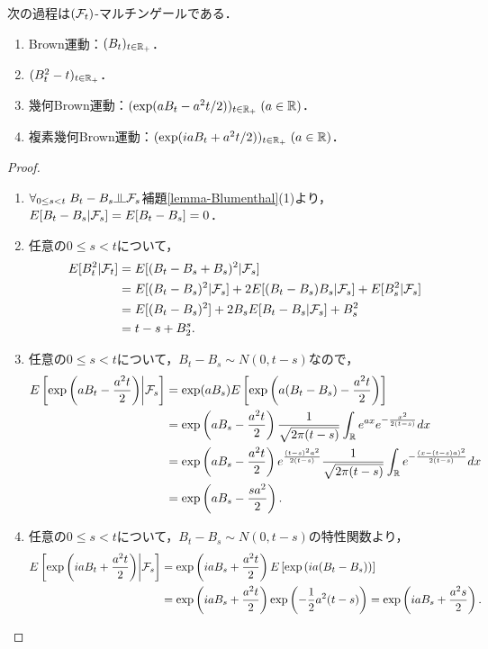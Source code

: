\documentclass[uplatex,dvipdfmx]{jsreport}
\begin{document}
\begin{theorem}
    次の過程は$(\mathcal{F}_t)$-マルチンゲールである．
    \begin{enumerate}
        \item Brown運動：$(B_t)_{t\in\mathbb{R}_+}$．
        \item $(B^2_t-t)_{t\in\mathbb{R}_+}$．
        \item 幾何Brown運動：$(\exp(aB_t-a^2t/2))_{t\in\mathbb{R}_+}\;(a\in\mathbb{R})$．
        \item 複素幾何Brown運動：$(\exp(iaB_t+a^2t/2))_{t\in\mathbb{R}_+}\;(a\in\mathbb{R})$．
    \end{enumerate}
\end{theorem}
\begin{proof}\mbox{}
    \begin{enumerate}
        \item $\forall_{0\le s<t}\;B_t-B_s\indep\F_s$補題\ref{lemma-Blumenthal}(1)より，$E[B_t-B_s|\mathcal{F}_s]=E[B_t-B_s]=0$．
        \item 任意の$0\le s<t$について，
        \begin{align*}
            E[B^2_t|\mathcal{F}_t]&=E[(B_t-B_s+B_s)^2|\mathcal{F}_s]\\
            &=E[(B_t-B_s)^2|\mathcal{F}_s]+2E[(B_t-B_s)B_s|\mathcal{F}_s]+E[B^2_s|\mathcal{F}_s]\\
            &=E[(B_t-B_s)^2]+2B_sE[B_t-B_s|\mathcal{F}_s]+B^2_s\\
            &=t-s+B_2^s.
        \end{align*}
        \item 任意の$0\le s<t$について，$B_t-B_s\sim N(0,t-s)$なので，
        \begin{align*}
            E\left[\exp\left(aB_t-\frac{a^2t}{2}\right)\middle|\mathcal{F}_s\right]&=\exp(aB_s)E\left[\exp\left(a(B_t-B_s)-\frac{a^2t}{2}\right)\right]\\
            &=\exp\left(aB_s-\frac{a^2t}{2}\right)\frac{1}{\sqrt{2\pi(t-s)}}\int_{\mathbb{R}} e^{ax}e^{-\frac{x^2}{2(t-s)}}dx\\
            &=\exp\left(aB_s-\frac{a^2t}{2}\right)e^{\frac{(t-s)^2a^2}{2(t-s)}}\frac{1}{\sqrt{2\pi(t-s)}}\int_{\mathbb{R}} e^{-\frac{(x-(t-s)a)^2}{2(t-s)}}dx\\
            &=\exp\left(aB_s-\frac{sa^2}{2}\right).
        \end{align*}
        \item 任意の$0\le s<t$について，$B_t-B_s\sim N(0,t-s)$の特性関数より，
        \begin{align*}
            E\left[\exp\left(iaB_t+\frac{a^2t}{2}\right)\middle|\mathcal{F}_s\right]&=\exp\left(iaB_s+\frac{a^2t}{2}\right)E\left[\exp\left(ia(B_t-B_s)\right)\right]\\
            &=\exp\left(iaB_s+\frac{a^2t}{2}\right)\exp\left(-\frac{1}{2}a^2(t-s)\right)=\exp\left(iaB_s+\frac{a^2s}{2}\right).
        \end{align*}
    \end{enumerate}
\end{proof}
\end{document}
